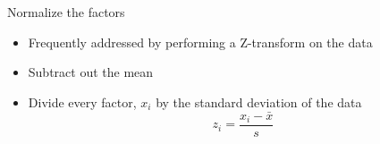 \documentclass[aspectratio=169]{beamer}
\begin{document}
\begin{frame}{Normalize the factors}

\begin{itemize}
\item Frequently addressed by performing a Z-transform on the data
\item Subtract out the mean
\item Divide every factor, $x_i$ by the standard deviation of the data
$$ z_i = \frac{x_i - \bar{x}}{s}$$

\end{itemize}
\end{frame}
%
\end{document}
